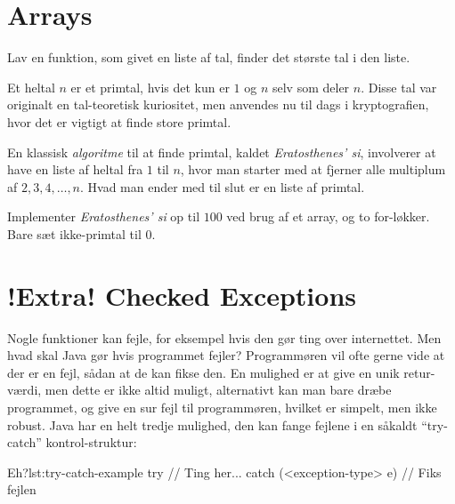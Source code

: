 \section{Arrays}



	\begin{exercise}
		Lav en funktion, som givet en liste af tal, finder det største tal i den
		liste.
	\end{exercise}

	\begin{exercise}
		Et heltal \(n\) er et primtal, hvis det kun er \(1\) og \(n\) selv som
		deler \(n\). Disse tal var originalt en tal-teoretisk kuriositet, men
		anvendes nu til dags i kryptografien, hvor det er vigtigt at finde store
		primtal.

		En klassisk \emph{algoritme} til at finde primtal, kaldet
		\emph{Eratosthenes' si}, involverer at have en liste af heltal fra \(1\)
		til \(n\), hvor man starter med at fjerner alle multiplum af
		\(2, 3, 4, \dots, n\). Hvad man ender med til slut er en liste af primtal.

		Implementer \emph{Eratosthenes' si} op til \(100\) ved brug af et
		array, og to for-løkker. Bare sæt ikke-primtal til \(0\).
	\end{exercise}

\section{!Extra! Checked Exceptions}

	Nogle funktioner kan fejle, for eksempel hvis den gør ting over internettet.
	Men hvad skal Java gør hvis programmet fejler? Programmøren vil ofte gerne
	vide at der er en fejl, sådan at de kan fikse den. En mulighed er at give en
	unik retur-værdi, men dette er ikke altid muligt, alternativt kan man bare
	dræbe programmet, og give en sur fejl til programmøren, hvilket er simpelt,
	men ikke robust. Java har en helt tredje mulighed, den kan fange fejlene i
	en såkaldt ``try-catch'' kontrol-struktur:

	\begin{JavaCode}{Eh?}{lst:try-catch-example}
		try {
			// Ting her...
		} catch (<exception-type> e) {
			// Fiks fejlen
		}
	\end{JavaCode}


